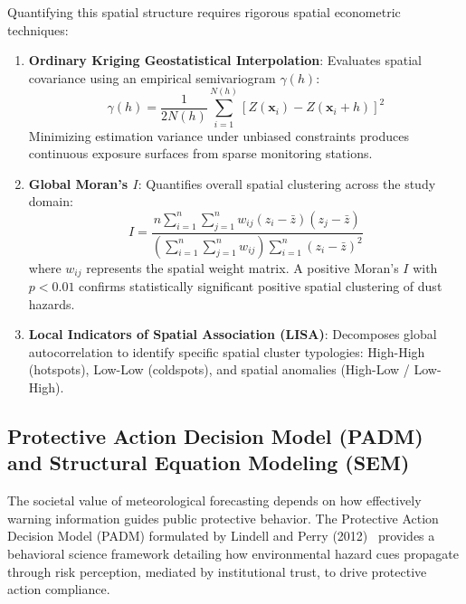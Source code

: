 Quantifying this spatial structure requires rigorous spatial econometric techniques:
\begin{enumerate}
    \item \textbf{Ordinary Kriging Geostatistical Interpolation}: Evaluates spatial covariance using an empirical semivariogram $\gamma(h)$:
    \begin{equation}
    \label{eq:semivariogram}
    \gamma(h) = \frac{1}{2 N(h)} \sum_{i=1}^{N(h)} \left[ Z(\mathbf{x}_i) - Z(\mathbf{x}_i + h) \right]^2
    \end{equation}
    Minimizing estimation variance under unbiased constraints produces continuous exposure surfaces from sparse monitoring stations.
    \item \textbf{Global Moran's $I$}: Quantifies overall spatial clustering across the study domain:
    \begin{equation}
    \label{eq:global_morans_i}
    I = \frac{n \sum_{i=1}^n \sum_{j=1}^n w_{ij} (z_i - \bar{z})(z_j - \bar{z})}{\left(\sum_{i=1}^n \sum_{j=1}^n w_{ij}\right) \sum_{i=1}^n (z_i - \bar{z})^2}
    \end{equation}
    where $w_{ij}$ represents the spatial weight matrix. A positive Moran's $I$ with $p < 0.01$ confirms statistically significant positive spatial clustering of dust hazards.
    \item \textbf{Local Indicators of Spatial Association (LISA)}: Decomposes global autocorrelation to identify specific spatial cluster typologies: High-High (hotspots), Low-Low (coldspots), and spatial anomalies (High-Low / Low-High).
\end{enumerate}

\subsection{Protective Action Decision Model (PADM) and Structural Equation Modeling (SEM)}
\label{subsec:padm_sem}

The societal value of meteorological forecasting depends on how effectively warning information guides public protective behavior. The Protective Action Decision Model (PADM) formulated by Lindell and Perry (2012)~\cite{lindell2012protective} provides a behavioral science framework detailing how environmental hazard cues propagate through risk perception, mediated by institutional trust, to drive protective action compliance.


